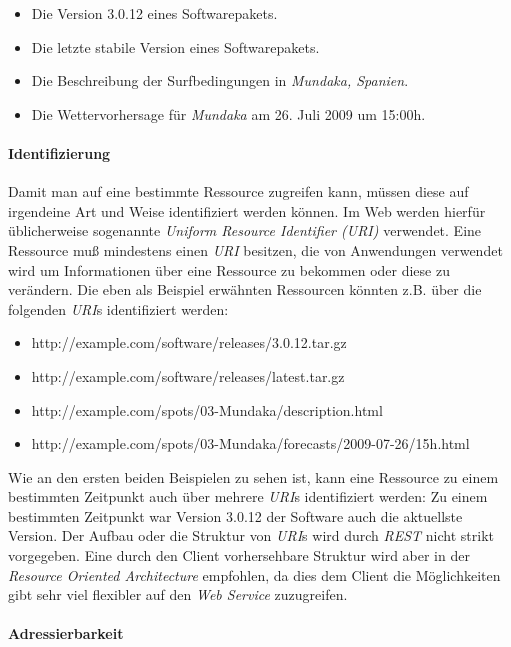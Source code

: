 \begin{itemize}
\item Die Version 3.0.12 eines Softwarepakets.
\item Die letzte stabile Version eines Softwarepakets.
\item Die Beschreibung der Surfbedingungen in \textit{Mundaka,
    Spanien}.
\item Die Wettervorhersage für \textit{Mundaka} am 26. Juli 2009 um 15:00h.
\end{itemize}

\paragraph{Identifizierung}
\label{paragraph:identifizierung}
Damit man auf eine bestimmte Ressource zugreifen kann, müssen diese
auf irgendeine Art und Weise identifiziert werden können. Im Web
werden hierfür üblicherweise sogenannte \textit{Uniform Resource
  Identifier (URI)} 
verwendet. Eine Ressource muß mindestens einen \textit{URI} besitzen,
die von Anwendungen verwendet wird um Informationen über eine
Ressource zu bekommen oder diese zu verändern. Die eben als Beispiel
erwähnten Ressourcen könnten z.B. über die folgenden \textit{URI}s
identifiziert werden:

{\sf \small
  \begin{itemize}
  \item http://example.com/software/releases/3.0.12.tar.gz
  \item http://example.com/software/releases/latest.tar.gz
  \item http://example.com/spots/03-Mundaka/description.html
  \item http://example.com/spots/03-Mundaka/forecasts/2009-07-26/15h.html
  \end{itemize}
}

Wie an den ersten beiden Beispielen zu sehen ist, kann eine Ressource
zu einem bestimmten Zeitpunkt auch über mehrere \textit{URI}s
identifiziert werden: Zu einem bestimmten Zeitpunkt war Version 3.0.12
der Software auch die aktuellste Version. Der Aufbau oder die Struktur
von \textit{URI}s wird durch \textit{REST} nicht strikt vorgegeben.
Eine durch den Client vorhersehbare Struktur wird aber in der
\textit{Resource Oriented Architecture} empfohlen, da dies dem Client
die Möglichkeiten gibt sehr viel flexibler auf den \textit{Web
  Service} zuzugreifen.

\paragraph{Adressierbarkeit}

